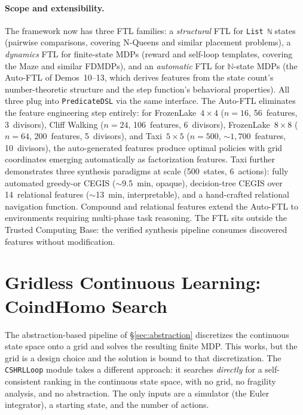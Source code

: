 \documentclass[9pt,a4paper]{article}
\theoremstyle{plain}
\theoremstyle{definition}
\theoremstyle{remark}
\begin{document}
\paragraph{Scope and extensibility.}
The framework now has three FTL families: a \emph{structural} FTL for \texttt{List~ℕ} states (pairwise comparisons, covering N-Queens and similar placement problems), a \emph{dynamics} FTL for finite-state MDPs (reward and self-loop templates, covering the Maze and similar FDMDPs), and an \emph{automatic} FTL for $\mathbb{N}$-state MDPs (the Auto-FTL of Demos~10--13, which derives features from the state count's number-theoretic structure and the step function's behavioral properties).  All three plug into \texttt{PredicateDSL} via the same interface.  The Auto-FTL eliminates the feature engineering step entirely: for FrozenLake~$4{\times}4$ ($n=16$, 56~features, 3~divisors), Cliff Walking ($n=24$, 106~features, 6~divisors), FrozenLake~$8{\times}8$ ($n=64$, 200~features, 5~divisors), and Taxi~$5{\times}5$ ($n=500$, ${\sim}1{,}700$~features, 10~divisors), the auto-generated features produce optimal policies with grid coordinates emerging automatically as factorization features.  Taxi further demonstrates three synthesis paradigms at scale (500~states, 6~actions): fully automated greedy-or CEGIS (${\sim}$9.5~min, opaque), decision-tree CEGIS over 14~relational features (${\sim}$13~min, interpretable), and a hand-crafted relational navigation function.  Compound and relational features extend the Auto-FTL to environments requiring multi-phase task reasoning.
The FTL sits outside the Trusted Computing Base: the verified synthesis pipeline consumes discovered features without modification.


\section{Gridless Continuous Learning: CoindHomo Search}
\label{sec:coind-homo-search}

The abstraction-based pipeline of \S\ref{sec:abstraction} discretizes the continuous state space onto a grid and solves the resulting finite MDP.  This works, but the grid is a design choice and the solution is bound to that discretization.  The \texttt{CSHRLLoop} module takes a different approach: it searches \emph{directly} for a self-consistent ranking in the continuous state space, with no grid, no fragility analysis, and no abstraction.  The only inputs are a simulator (the Euler integrator), a starting state, and the number of actions.
\end{document}
